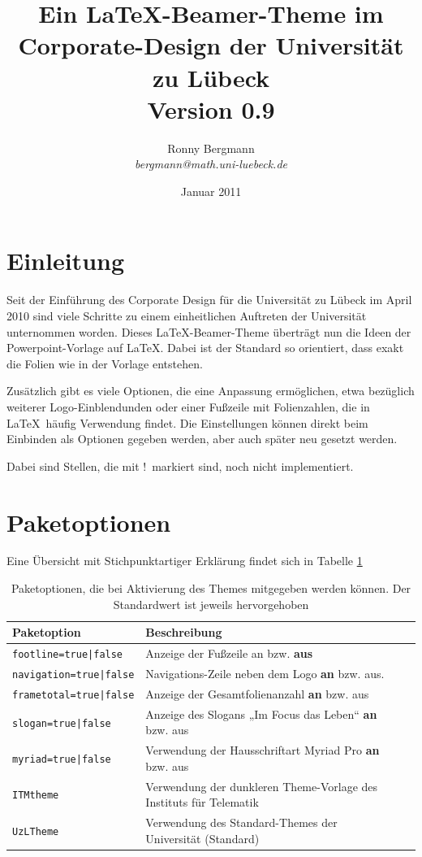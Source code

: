 \documentclass[a4paper,DIV=calc, oneside]{scrartcl}
\newcommand{\missing}{{\color{red}!}}
\begin{document}
	\thispagestyle{empty}
\title{\vspace{-3\baselineskip}Ein \textnormal{\LaTeX}-Beamer-Theme im Corporate-Design der Universität zu Lübeck\\{\large\normalfont Version 0.9}}
\author{Ronny Bergmann\\\emph{bergmann@math.uni-luebeck.de}}
\date{Januar 2011}
\maketitle
\section{Einleitung}
Seit der Einführung des Corporate Design für die Universität zu Lübeck im April 2010 sind viele Schritte zu einem einheitlichen Auftreten der Universität unternommen worden. Dieses \LaTeX-Beamer-Theme überträgt nun die Ideen der
Powerpoint-Vorlage auf \LaTeX. Dabei ist der Standard so orientiert, dass exakt die Folien wie in der Vorlage entstehen.

Zusätzlich gibt es viele Optionen, die eine Anpassung ermöglichen, etwa bezüglich weiterer Logo-Einblendunden oder
einer Fußzeile mit Folienzahlen, die in \LaTeX\ häufig Verwendung findet. Die Einstellungen können direkt beim Einbinden als Optionen gegeben werden, aber auch später neu gesetzt werden.

Dabei sind Stellen, die mit \missing\  markiert sind, noch nicht implementiert.

\section{Paketoptionen}
Eine Übersicht mit Stichpunktartiger Erklärung findet sich in Tabelle \ref{tab:Paketoptionen}
\begin{table}[hbt]
	\begin{tabular}{llll}
		\toprule
		\textbf{Paketoption} & \textbf{Beschreibung}\\\midrule
		\lstinline!footline=true|false! & Anzeige der Fußzeile an bzw. \textbf{aus}\\
		\lstinline!navigation=true|false! & Navigations-Zeile neben dem Logo \textbf{an} bzw. aus.\\
		\lstinline!frametotal=true|false! & Anzeige der Gesamtfolienanzahl \textbf{an} bzw. aus\\
		\lstinline!slogan=true|false! & Anzeige des Slogans „Im Focus das Leben“ \textbf{an} bzw. aus\\
		\lstinline!myriad=true|false! & Verwendung der Hausschriftart Myriad Pro \textbf{an} bzw. aus\\
		\lstinline!ITMtheme! & Verwendung der dunkleren Theme-Vorlage des Instituts für Telematik\\
		\lstinline!UzLTheme! & Verwendung des Standard-Themes der Universität (Standard)\\\bottomrule
	\end{tabular}
	\caption{Paketoptionen, die bei Aktivierung des Themes mitgegeben werden können. Der Standardwert ist jeweils hervorgehoben}
	\label{tab:Paketoptionen}
\end{table}
\end{document}
